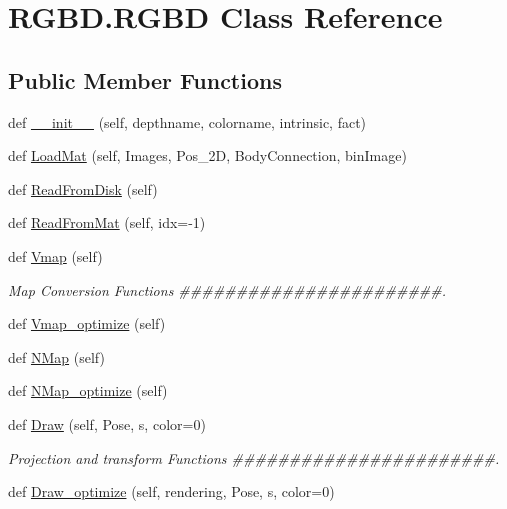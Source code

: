 \hypertarget{class_r_g_b_d_1_1_r_g_b_d}{}\section{R\+G\+B\+D.\+R\+G\+BD Class Reference}
\label{class_r_g_b_d_1_1_r_g_b_d}
\subsection*{Public Member Functions}
\begin{DoxyCompactItemize}
\item 
def \hyperlink{class_r_g_b_d_1_1_r_g_b_d_adf3e96f8b0620fd3f68b2399d29c3b12}{\+\_\+\+\_\+init\+\_\+\+\_\+} (self, depthname, colorname, intrinsic, fact)
\item 
def \hyperlink{class_r_g_b_d_1_1_r_g_b_d_accb9314bc9a43859adbcbb85283e3722}{Load\+Mat} (self, Images, Pos\+\_\+2D, Body\+Connection, bin\+Image)
\item 
def \hyperlink{class_r_g_b_d_1_1_r_g_b_d_a65ca0d3759c2b9977b24c952b9057ac9}{Read\+From\+Disk} (self)
\item 
def \hyperlink{class_r_g_b_d_1_1_r_g_b_d_ac7350dc76ae47fdd77c0ad93a74910db}{Read\+From\+Mat} (self, idx=-\/1)
\item 
def \hyperlink{class_r_g_b_d_1_1_r_g_b_d_a98624ce143f3ea4b766e337467faaf68}{Vmap} (self)
\begin{DoxyCompactList}\small\item\em Map Conversion Functions \#\#\#\#\#\#\#\#\#\#\#\#\#\#\#\#\#\#\#\#\#\#\#. \end{DoxyCompactList}\item 
def \hyperlink{class_r_g_b_d_1_1_r_g_b_d_a2686c0b37c9c4cf8a650656680402797}{Vmap\+\_\+optimize} (self)
\item 
def \hyperlink{class_r_g_b_d_1_1_r_g_b_d_a9cba8018f1cdb3f5c73c863a49549061}{N\+Map} (self)
\item 
def \hyperlink{class_r_g_b_d_1_1_r_g_b_d_ae269b01a123ea0c10cd0317b510e7ef9}{N\+Map\+\_\+optimize} (self)
\item 
def \hyperlink{class_r_g_b_d_1_1_r_g_b_d_ac3ebcc6ae06496726d76d73c5f83b735}{Draw} (self, Pose, s, color=0)
\begin{DoxyCompactList}\small\item\em Projection and transform Functions \#\#\#\#\#\#\#\#\#\#\#\#\#\#\#\#\#\#\#\#\#\#\#. \end{DoxyCompactList}\item 
def \hyperlink{class_r_g_b_d_1_1_r_g_b_d_a6fa82c4fbe506f20bf54911c385be73f}{Draw\+\_\+optimize} (self, rendering, Pose, s, color=0)

\end{DoxyCompactItemize}
